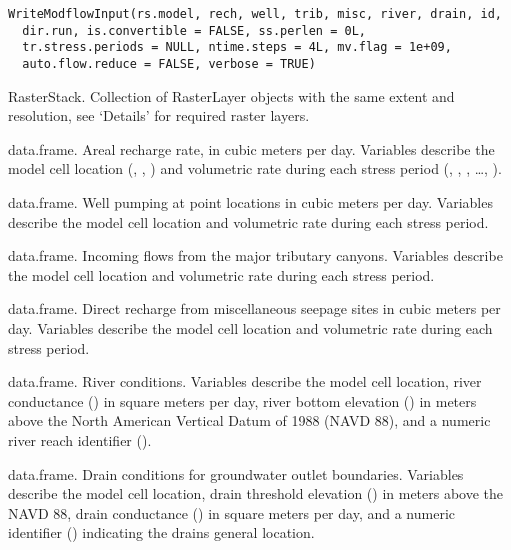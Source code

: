 \documentclass[a4paper]{book}
\begin{document}
%
\begin{Usage}
\begin{verbatim}
WriteModflowInput(rs.model, rech, well, trib, misc, river, drain, id,
  dir.run, is.convertible = FALSE, ss.perlen = 0L,
  tr.stress.periods = NULL, ntime.steps = 4L, mv.flag = 1e+09,
  auto.flow.reduce = FALSE, verbose = TRUE)
\end{verbatim}
\end{Usage}
%
\begin{Arguments}
\begin{ldescription}
\item[\code{rs.model}] RasterStack.
Collection of RasterLayer objects with the same extent and resolution,
see `Details' for required raster layers.

\item[\code{rech}] data.frame.
Areal recharge rate, in cubic meters per day.
Variables describe the model cell location (, , ) and
volumetric rate during each stress period
(, , , \dots, ).

\item[\code{well}] data.frame.
Well pumping at point locations in cubic meters per day.
Variables describe the model cell location and volumetric rate during each stress period.

\item[\code{trib}] data.frame.
Incoming flows from the major tributary canyons.
Variables describe the model cell location and volumetric rate during each stress period.

\item[\code{misc}] data.frame.
Direct recharge from miscellaneous seepage sites in cubic meters per day.
Variables describe the model cell location and volumetric rate during each stress period.

\item[\code{river}] data.frame.
River conditions.
Variables describe the model cell location, river conductance
() in square meters per day, river bottom elevation () in
meters above the North American Vertical Datum of 1988 (NAVD 88), and
a numeric river reach identifier ().

\item[\code{drain}] data.frame.
Drain conditions for groundwater outlet boundaries.
Variables describe the model cell location, drain threshold elevation
() in meters above the NAVD 88, drain conductance () in
square meters per day, and a numeric identifier () indicating the
drains general location.


\end{ldescription}
\end{Arguments}
\end{document}
